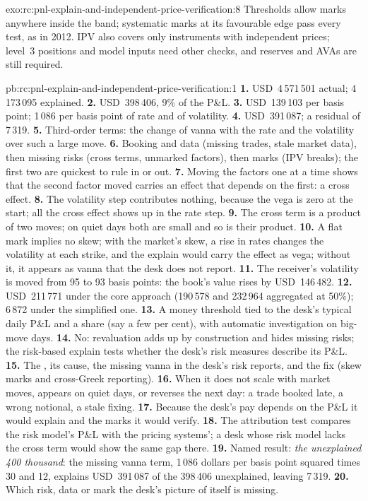\begin{solution}{exo:rc:pnl-explain-and-independent-price-verification:8}
Thresholds allow marks anywhere inside the band; systematic marks at its favourable edge pass every
test, as in 2012. IPV also covers only instruments with independent prices; level~3 positions and
model inputs need other checks, and reserves and AVAs are still required.
\end{solution}

\begin{solution}{pb:rc:pnl-explain-and-independent-price-verification:1}
\textbf{1.} USD~4\,571\,501 actual; 4\,173\,095 explained.
\textbf{2.} USD~398\,406, 9\% of the P\&L.
\textbf{3.} USD~139\,103 per basis point; 1\,086 per basis point of rate and of volatility.
\textbf{4.} USD~391\,087; a residual of 7\,319.
\textbf{5.} Third-order terms: the change of vanna with the rate and the volatility over such a large move.
\textbf{6.} Booking and data (missing trades, stale market data), then missing risks (cross terms,
unmarked factors), then marks (IPV breaks); the first two are quickest to rule in or out.
\textbf{7.} Moving the factors one at a time shows that the second factor moved carries an effect that
depends on the first: a cross effect.
\textbf{8.} The volatility step contributes nothing, because the vega is zero at the start; all the cross
effect shows up in the rate step.
\textbf{9.} The cross term is a product of two moves; on quiet days both are small and so is their product.
\textbf{10.} A flat mark implies no skew; with the market's skew, a rise in rates changes the volatility at
each strike, and the explain would carry the effect as vega; without it, it appears as vanna that the desk
does not report.
\textbf{11.} The receiver's volatility is moved from 95 to 93 basis points: the book's value rises by
USD~146\,482.
\textbf{12.} USD~211\,771 under the core approach (190\,578 and 232\,964 aggregated at 50\%); 6\,872 under the
simplified one.
\textbf{13.} A money threshold tied to the desk's typical daily P\&L and a share (say a few per cent), with
automatic investigation on big-move days.
\textbf{14.} No: revaluation adds up by construction and hides missing risks; the risk-based explain tests
whether the desk's risk measures describe its P\&L.
\textbf{15.} The , its cause, the missing vanna in the desk's risk reports, and the fix
(skew marks and cross-Greek reporting).
\textbf{16.} When it does not scale with market moves, appears on quiet days, or reverses the next day: a
trade booked late, a wrong notional, a stale fixing.
\textbf{17.} Because the desk's pay depends on the P\&L it would explain and the marks it would verify.
\textbf{18.} The attribution test compares the risk model's P\&L with the pricing systems'; a desk whose
risk model lacks the cross term would show the same gap there.
\textbf{19.} Named result: \emph{the unexplained 400 thousand}: the missing vanna term, 1\,086 dollars per basis
point squared times 30 and 12, explains USD~391\,087 of the 398\,406 unexplained, leaving 7\,319.
\textbf{20.} Which risk, data or mark the desk's picture of itself is missing.
\end{solution}

